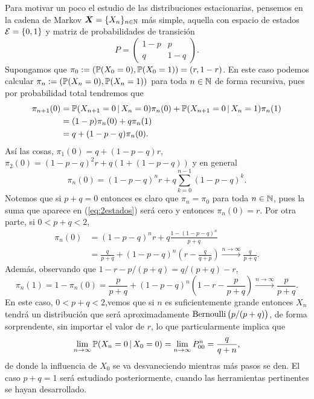 Para motivar un poco el estudio de las distribuciones estacionarias, pensemos en la cadena de Markov $\bm X = \{X_n\}_{n \in \mathbb{N}}$ más simple, aquella con espacio de estados $\mathcal{E} = \{0,1\}$ y matriz de probabilidades de transición 
\[
    P = \begin{pmatrix}
       1-p & p \\
       q & 1-q 
    \end{pmatrix}.
\]
Supongamos que $\pi_0 := (\mathbb{P}(X_0 = 0), \mathbb{P}(X_0 = 1)) = (r, 1-r)$. En  este caso podemos calcular $\pi_n := (\mathbb{P}(X_n = 0), \mathbb{P}(X_n = 1))$ para toda $n \in \mathbb{N}$ de forma recursiva, pues por probabilidad total tendremos que
\begin{align*}
    \pi_{n+1}(0) & = \mathbb{P}(X_{n+1} = 0 \,\vert\, X_n = 0) \pi_n(0) + \mathbb{P}(X_{n+1} = 0 \,\vert\, X_n = 1) \pi_n(1) \\
    & = (1-p) \pi_n(0) + q \pi_n(1) \\
    & = q + (1 - p - q) \pi_n(0).
\end{align*}
Así las cosas, $\pi_1(0) = q + (1-p-q)r$, $\pi_2(0) = (1-p-q)^2 r + q  (1 + (1-p-q))$ y en general 
\begin{equation}
    \pi_n(0) = (1-p-q)^n r + q \sum_{k = 0}^{n-1} (1 - p - q)^k. \label{eq:2estados}
\end{equation}
Notemos que si $p + q = 0$ entonces es claro que $\pi_n = \pi_0$ para toda $n \in \mathbb{N}$, pues la suma que aparece en (\ref{eq:2estados}) será cero y entonces $\pi_n(0) = r$. Por otra parte, si  $0 < p + q < 2$,
\[
    \begin{split}
        \pi_n(0) & = (1 - p - q)^n r + q \frac{1 -  (1 - p - q)^n}{p+q} \\
        & = \frac{q}{p+q} + (1-p-q)^n \left(r - \frac{q}{q+p}\right) \stackrel{n \to \infty}{\longrightarrow} \frac{q}{p + q}.
    \end{split}
\] 
Además, observando que $ 1 - r - p /  (p + q) = q/(p+q) - r$, 
\[
    \pi_n(1) = 1 - \pi_n(0) = \frac{p}{p+q} + (1-p-q)^n \left(1 - r - \frac{p}{p + q} \right) \stackrel{n \to \infty}{\longrightarrow} \frac{p}{p + q}. 
\]
En este caso, $0 < p+q < 2$,vemos que si $n$ es suficientemente grande entonces $X_n$ tendrá un distribución que será aproximadamente $\operatorname{Bernoulli}\big(p/(p+q)\big)$, de forma sorprendente, sin importar el valor de $r$, lo que particularmente implica que 
\[
    \lim_{n \to \infty} \mathbb{P}(X_n = 0 \,\vert\, X_0 = 0) = \lim_{n \to \infty} P_{00}^n = \frac{q}{q+n},
\]
de donde la influencia de $X_0$ se va desvaneciendo mientras más pasos se den. El caso $p+q = 1$ será estudiado posteriormente, cuando las herramientas pertinentes se hayan desarrollado. 